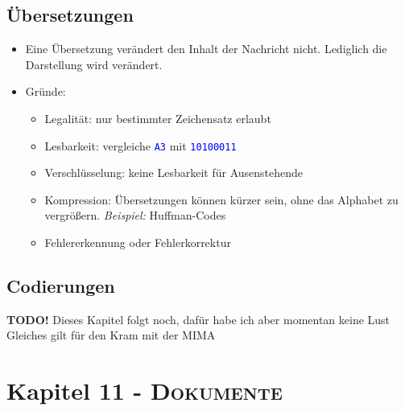 \documentclass{article}
\newcommand{\kapitel}[2]{Kapitel #1 - \textsc{#2}}
\newcommand{\blue}[1]{\textcolor{blue}{#1}}
\newcommand{\strongColor}[1]{\textcolor{strongColor}{#1}}
\newcommand{\strong}[1]{\textbf{\strongColor{#1}}}
\newcommand{\important}[1]{\textcolor{importantColor}{#1}}
\newcommand{\example}[1]{\textit{Beispiel: }#1}
\newcommand{\word}[1]{\blue{\texttt{#1}}}
\begin{document}
\subsection{Übersetzungen}
\begin{itemize}
    \item Eine Übersetzung verändert den Inhalt der Nachricht nicht. Lediglich die Darstellung wird verändert.
    \item Gründe:
    \begin{itemize}
        \item \important{Legalität}: nur bestimmter Zeichensatz erlaubt
        \item \important{Lesbarkeit}: vergleiche \word{A3} mit \word{10100011}
        \item \important{Verschlüsselung}: keine Lesbarkeit für Ausenstehende
        \item \important{Kompression}: Übersetzungen können kürzer sein, ohne das Alphabet zu vergrößern. \example{Huffman-Codes}
        \item \important{Fehlererkennung} oder \important{Fehlerkorrektur}
    \end{itemize}
\end{itemize}

\subsection{Codierungen}


\strong{TODO!} Dieses Kapitel folgt noch, dafür habe ich aber momentan keine Lust\\Gleiches gilt für den Kram mit der MIMA

\newpage
\section{\kapitel{11}{Dokumente}}
\end{document}
